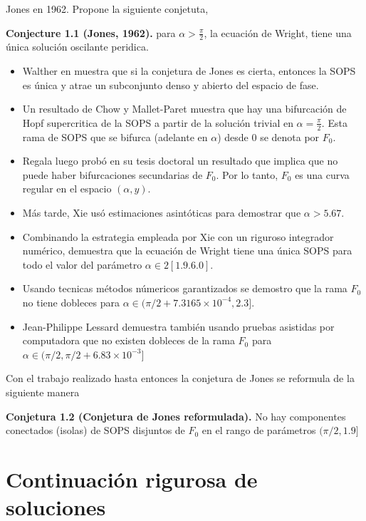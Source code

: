 \documentclass[11pt]{article}
\begin{document}
    Jones en 1962. Propone la siguiente conjetuta,

\textbf{Conjecture 1.1 (Jones, 1962).} para \(\alpha > \frac{\pi}{2}\),
la ecuación de Wright, tiene una única solución oscilante peridica.

    \begin{itemize}
\item
  Walther en muestra que si la conjetura de Jones es cierta, entonces la
  SOPS es única y atrae un subconjunto denso y abierto del espacio de
  fase.
\item
  Un resultado de Chow y Mallet-Paret muestra que hay una bifurcación de
  Hopf supercritica de la SOPS a partir de la solución trivial en
  \(\alpha = \frac{\pi}{2}\). Esta rama de SOPS que se bifurca (adelante
  en \(\alpha\)) desde \(0\) se denota por \(F_0\).
\item
  Regala luego probó en su tesis doctoral un resultado que implica que
  no puede haber bifurcaciones secundarias de \(F_0\). Por lo tanto,
  \(F_0\) es una curva regular en el espacio \((\alpha, y)\).
\item
  Más tarde, Xie usó estimaciones asintóticas para demostrar que
  \(\alpha > 5.67\).
\item
  Combinando la estrategia empleada por Xie con un riguroso integrador
  numérico, demuestra que la ecuación de Wright tiene una única SOPS
  para todo el valor del parámetro \(\alpha \in 2 [1.9.6.0]\).
\item
  Usando tecnicas métodos númericos garantizados se demostro que la rama
  \(F_0\) no tiene dobleces para
  \(\alpha \in (\pi/2 + 7.3165 \times 10^{-4}, 2.3]\).
\item
  Jean-Philippe Lessard demuestra también usando pruebas asistidas por
  computadora que no existen dobleces de la rama \(F_0\) para
  \(\alpha \in (\pi/2, \pi/2 + 6.83 \times 10^{-3}]\)
\end{itemize}

    Con el trabajo realizado hasta entonces la conjetura de Jones se
reformula de la siguiente manera

\textbf{Conjetura 1.2 (Conjetura de Jones reformulada).} No hay
componentes conectados (isolas) de SOPS disjuntos de \(F_0\) en el rango
de parámetros \((\pi/2, 1.9]\)

    \hypertarget{continuaciuxf3n-rigurosa-de-soluciones}{%
\section{Continuación rigurosa de
soluciones}\label{continuaciuxf3n-rigurosa-de-soluciones}}
\end{document}
